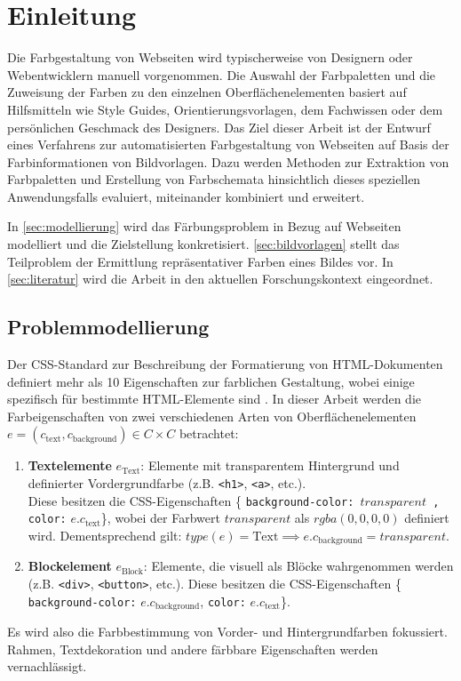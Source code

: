 \section{Einleitung}

Die Farbgestaltung von Webseiten wird typischerweise von Designern oder Webentwicklern manuell vorgenommen. Die Auswahl der Farbpaletten und die Zuweisung der Farben zu den einzelnen Oberflächenelementen basiert auf Hilfsmitteln wie Style Guides, Orientierungsvorlagen, dem Fachwissen oder dem persönlichen Geschmack des Designers. Das Ziel dieser Arbeit ist der Entwurf eines Verfahrens zur automatisierten Farbgestaltung von Webseiten auf Basis der Farbinformationen von Bildvorlagen. Dazu werden Methoden zur Extraktion von Farbpaletten und Erstellung von Farbschemata hinsichtlich dieses speziellen Anwendungsfalls evaluiert, miteinander kombiniert und erweitert.

In \autoref{sec:modellierung} wird das Färbungsproblem in Bezug auf Webseiten modelliert und die Zielstellung konkretisiert. \autoref{sec:bildvorlagen} stellt das Teilproblem der Ermittlung repräsentativer Farben eines Bildes vor. In \autoref{sec:literatur} wird die Arbeit in den aktuellen Forschungskontext eingeordnet.

\subsection{Problemmodellierung}
\label{sec:modellierung}

Der CSS-Standard zur Beschreibung der Formatierung von HTML-Dokumenten definiert mehr als 10 Eigenschaften zur farblichen Gestaltung, wobei einige spezifisch für bestimmte  HTML-Elemente sind  \citep{css3-color}. In dieser Arbeit werden die Farbeigenschaften von zwei verschiedenen Arten von Oberflächenelementen $e = (c_\text{text}, c_\text{background}) \in C \times C$ betrachtet:
\begin{enumerate}
	\item \textbf{Textelemente} $e_\text{Text}$: Elemente mit transparentem Hintergrund und definierter Vordergrundfarbe (z.B. \texttt{<h1>}, \texttt{<a>}, etc.).\\Diese besitzen die CSS-Eigenschaften \{ \texttt{background-color: }$transparent$\texttt{ , color:} $e.c_\text{text}$\}, wobei der Farbwert $transparent$ als $rgba(0, 0, 0, 0)$ definiert wird. Dementsprechend gilt: $type(e) = \text{Text} \implies e.c_\text{background} = transparent$.\\
	\item  \textbf{Blockelement} $e_\text{Block}$: Elemente, die visuell als Blöcke wahrgenommen werden (z.B. \texttt{<div>}, \texttt{<button>}, etc.). Diese besitzen die CSS-Eigenschaften \{ \texttt{background-color:} $e.c_\text{background}$, \texttt{color:} $e.c_\text{text}$\}.
\end{enumerate}
Es wird also die Farbbestimmung von Vorder- und Hintergrundfarben fokussiert. Rahmen, Textdekoration und andere färbbare Eigenschaften werden vernachlässigt.

